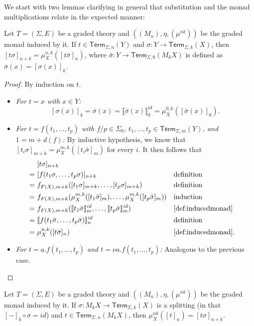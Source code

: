 \documentclass[a4paper,UKenglish,cleveref,thm-restate,numberwithinsect,final]{lipics-v2021}
\newcommand{\Term}{\mathsf{Term}}
\newcommand{\sig}{\Sigma}
\newcommand{\sigp}{\Sigma_0}
\theoremstyle{plain}
\newcommand{\id}{\mathit{id}}
\numberwithin{equation}{section}
\newcommand{\+}[1]{\mathcal{#1}\xspace}
\theoremstyle{definition}
\begin{document}
We start with two lemmas clarifying in general that substitution and the monad multiplications relate in the expected manner:
\begin{lemma}\label{thm:multiplicationsubstitution}
  Let \(T = (\sig, E)\) be a graded theory and
  \(((M_n), \eta, (\mu^{nk}))\) be the graded monad induced by it.  If
  \(t \in \Term_{\sig, n}(Y)\) and
  \(\sigma: Y \to \Term_{\sig, k}(X)\), then
  \([t\sigma]_{n + k} = \mu^{n, k}_X([t\bar{\sigma}]_n)\), where
  \(\bar{\sigma}: Y \to \Term_{\sig, 0}(M_k X)\) is defined as
  \(\bar{\sigma}(x) = [\sigma(x)]_k\).
\end{lemma}

\begin{proof}
    By induction on \(t\).
    \begin{itemize}
        \item
            \textit{For \(t = x\) with \(x \in Y\):}
            \[
                [\sigma(x)]_{k} = \bar{\sigma}(x) = \llbracket \bar{\sigma}(x) \rrbracket^\id_0 = \mu^{0, k}_X([\bar{\sigma}(x)]_0).
            \]
        \item
            \textit{For \(t = f(t_1, \ldots, t_p)\) with \(f/p \in \sigp\), \(t_1, \ldots, t_p \in \Term_{\sig, m}(Y)\), and \(1 = m + d(f)\):}
            By inductive hypothesis, we know that \([t_i\sigma]_{m + k} = \mu^{m, k}_X([t_i\bar{\sigma}]_m)\) for every \(i\).
            It then follows that
            \begin{align*}
                &[t\sigma]_{n + k} \\
                =~&[f(t_1\sigma, \ldots, t_p\sigma)]_{n + k} && \text{definition} \\
                =~&f_{F(X), m + k}([t_1\sigma]_{m + k}, \ldots, [t_p\sigma]_{m + k}) && \text{definition} \\
                =~&f_{F(X), m + k}(\mu^{m, k}_X([t_1\bar{\sigma}]_m), \ldots, \mu^{m, k}_X([t_p\bar{\sigma}]_m)) && \text{induction} \\
                =~&f_{F(X), m + k}(\llbracket t_1\bar{\sigma} \rrbracket^\id_m, \ldots, \llbracket t_p\bar{\sigma} \rrbracket^\id_m) && \text{\cref{def:inducedmonad}} \\
                =~&\llbracket f(t_1\bar{\sigma}, \ldots, t_p\bar{\sigma}) \rrbracket^\id_{n} && \text{definition} \\
                =~&\mu^{n, k}_X([t\bar{\sigma}]_n) && \text{\cref{def:inducedmonad}}.
            \end{align*}
        \item
            \textit{For \(t = a.f(t_1, \ldots, t_p)\) and \(t = \nu a.f(t_1, \ldots, t_p)\):}
            Analogous to the previous case.
    \end{itemize}

\end{proof}
\begin{lemma}\label{thm:multiplicationsplitting}
    Let \(T = (\sig, E)\) be a graded theory and \(((M_n), \eta, (\mu^{nk}))\) be the graded monad induced by it.
    If \(\sigma: M_k X \to \Term_{\sig, k}(X)\) is a splitting (in that \([-]_k \circ \sigma = \id\)) and \(t \in \Term_{\sig, n}(M_k X)\), then \(\mu^{nk}_X([t]_n) = [t\sigma]_{n + k}\).
\end{lemma}
\end{document}
